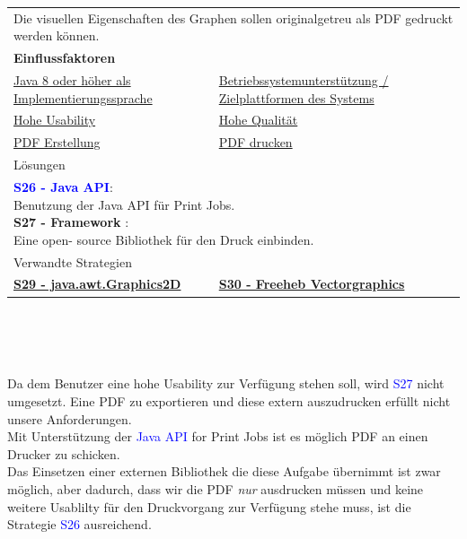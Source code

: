 \documentclass[enabledeprecatedfontcommands,fontsize=11pt,paper=a4,twoside]{scrartcl}
\newcounter{one}
\newcommand{\cb}[1]{{\textcolor{blue}{#1}}}
\begin{document}
\begin{tabular} {|p{8cm} p{8cm}|}
	\hline
	\rowcolor{prob}\multicolumn{2}{|l|}{\parbox{16cm}{\textbf{09: PDF Druck}}} \\  \hline\hline 
	\multicolumn{2}{|l|}{\parbox{16cm}{Die visuellen Eigenschaften des Graphen sollen originalgetreu als PDF gedruckt werden können.}}\rule{0pt}{1ex}\\  \hline
	\multicolumn{2}{|l|}{\textbf{Einflussfaktoren}}\\
	\hyperlink{b}{Java 8 oder höher als Implementierungssprache} &
	\hyperlink {f}{Betriebssystemunterstützung / Zielplattformen des Systems}\\
	\hyperlink {g}{Hohe Usability}&
	\hyperlink {h}{Hohe Qualität}\\
	\hyperlink {kk}{PDF Erstellung} &
	\hyperlink {ll}{PDF drucken} 
	\\ \hline
	\multicolumn{2}{|l|}{Lösungen} \\
	\multicolumn{2}{|l|}{\parbox{16cm}{
			\textbf{\cb{\hypertarget{ggg}{S26 - Java API}}}: \\
			Benutzung der Java API für Print Jobs. \\
			\textbf{S27 - Framework }: \\
			Eine open- source Bibliothek für den Druck einbinden.
	} }\\ [7ex] \hline
	\multicolumn{2}{|l|}{Verwandte Strategien} \\
	\textbf{\hyperlink{hhh}{S29 - java.awt.Graphics2D}} &
	\textbf{\hyperlink{iii}{S30 - Freeheb Vectorgraphics}}
	\\\hline
\end{tabular}\\ \\ \\
\begin{onehalfspace}
	Da dem Benutzer eine hohe Usability zur Verfügung stehen soll, wird \cb{S27} nicht umgesetzt. Eine PDF zu exportieren und diese extern auszudrucken erfüllt nicht unsere Anforderungen. \\
	Mit Unterstützung der \cb{Java API} for Print Jobs ist es möglich PDF an einen Drucker zu schicken. \\
	Das Einsetzen einer externen Bibliothek die diese Aufgabe übernimmt ist zwar möglich, aber dadurch, dass wir die PDF \textit{nur} ausdrucken müssen und keine weitere Usablilty für den Druckvorgang zur Verfügung stehe muss, ist die Strategie \cb{S26} ausreichend.
\end{onehalfspace}
\end{document}
